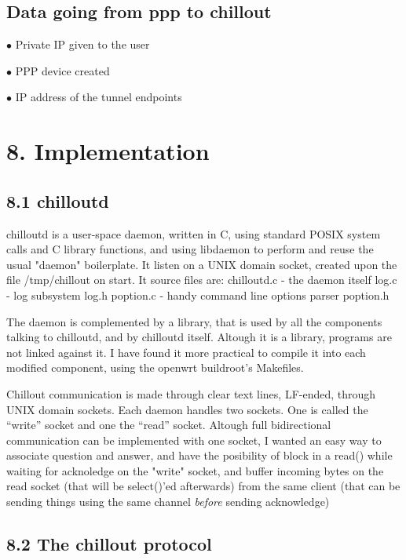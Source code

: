 \subsection{Data going from ppp to chillout}
 \item {$\bullet$} Private IP given to the user
 \item {$\bullet$} PPP device created
 \item {$\bullet$} IP address of the tunnel endpoints
 

\section{8. Implementation}

\subsection{8.1 chilloutd}

chilloutd is a user-space daemon, written in C, using standard POSIX system
calls and C library functions, and using libdaemon to perform and reuse the
usual "daemon" boilerplate. It listen on a UNIX domain socket, created upon
the file /tmp/chillout on start. It source files are:
\begintt
chilloutd.c - the daemon itself  
log.c	    - log subsystem
log.h
poption.c   - handy command line options parser
poption.h
\endtt


The daemon is complemented by a library, that is used by all the components
talking to chilloutd, and by chilloutd itself. Altough it is a library, 
programs are not linked against it. I have found it more practical to
compile it into each modified component, using the openwrt buildroot's
Makefiles.

{\tt {}}

Chillout communication is made through clear text lines, LF-ended,
through UNIX domain sockets. Each daemon handles two sockets. One is called
the ``write'' socket and one the ``read'' socket. Altough full bidirectional
communication can be implemented with one socket, I wanted an easy way to
associate question and answer, and have the posibility of block in a read()
while waiting for acknoledge on the "write" socket, and buffer incoming
bytes on the read socket (that will be select()'ed afterwards) from the same
client (that can be sending things using the same channel {\sl before} 
sending acknowledge)

\subsection{8.2 The chillout protocol}

